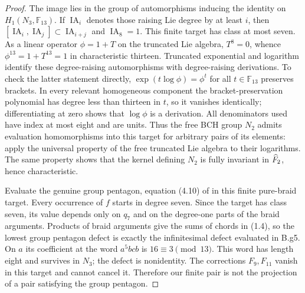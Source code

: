 \begin{proof}
The image lies in the group of automorphisms inducing the identity
on $H_1(N_3,\mathbb F_{13})$.  If $\operatorname{IA}_i$ denotes
those raising Lie degree by at least $i$, then
$[\operatorname{IA}_i,\operatorname{IA}_j]\subset
\operatorname{IA}_{i+j}$ and $\operatorname{IA}_8=1$.
This finite target has class at most seven.  As a linear operator
$\phi=1+T$ on the truncated Lie algebra, $T^8=0$, whence
$\phi^{13}=1+T^{13}=1$ in characteristic thirteen.
Truncated exponential and logarithm identify these degree-raising
automorphisms with degree-raising derivations.  To check the latter
statement directly, $\exp(t\log\phi)=\phi^t$ for all
$t\in\mathbb F_{13}$ preserves brackets.  In every relevant
homogeneous component the bracket-preservation polynomial has degree
less than thirteen in $t$, so it vanishes identically; differentiating
at zero shows that $\log\phi$ is a derivation.
All denominators used have index at most eight and are units.
Thus the free BCH group $N_2$ admits evaluation homomorphisms into
this target for arbitrary pairs of its elements: apply the universal
property of the free truncated Lie algebra to their logarithms.
The same property shows that the kernel defining $N_2$ is fully
invariant in $\widehat F_2$, hence characteristic.

Evaluate the genuine group pentagon, equation (4.10) of
\citet{Drinfeld1990g} in this finite pure-braid target.
Every occurrence of $f$ starts in degree seven.  Since the target
has class seven, its value depends only on $q_7$ and on the
degree-one parts of the braid arguments.  Products of braid
arguments give the sums of chords in (1.4), so the lowest group
pentagon defect is exactly the infinitesimal defect evaluated in
B.g5.  On $a$ its coefficient at the word $a^5bcb$ is
$16\equiv3\pmod{13}$.  This word has length eight and survives
in $N_3$; the defect is nonidentity.  The corrections $F_9,F_{11}$
vanish in this target and cannot cancel it.  Therefore our finite
pair is not the projection of a pair satisfying the group pentagon.


\end{proof}
